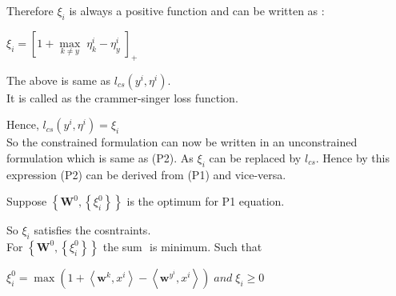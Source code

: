 \documentclass[a4paper,11pt]{article}
\begin{document}
\begin{mlsolution}
Therefore \begin{math} \xi_{i}\end{math} is always a positive function and can be written as :

\begin{math}\xi_{i} =   \left [  1 + \underset{k\neq y}{\max} \;\eta_{k}^{i} - \eta_{y} ^{i}\;\right ]_{+}\end{math}

The above is same as \begin{math} l_{cs}\left ( y^{i},\eta ^{i} \right ) \end{math}.\\ It is called as the crammer-singer loss function.

Hence, \begin{math} l_{cs}\left ( y^{i},\eta ^{i} \right ) = \xi _{i} \end{math}\\

So the constrained formulation can now be written in an unconstrained formulation which is same as (P2). As \begin{math} \xi _{i} \end{math} can be replaced by \begin{math} l_{cs}\end{math}. Hence by this expression (P2) can be derived from (P1) and vice-versa.

Suppose \begin{math} \left \{ \textbf{W}^{0}, \left \{ \xi _{i}^{0} \right \} \right \} \end{math} is the optimum for P1 equation.

So \begin{math}\xi_{i}\end{math} satisfies the cosntraints.\\

For \begin{math} \left \{ \textbf{W}^{0}, \left \{ \xi _{i}^{0} \right \} \right \} \end{math} the sum \begin{math}  \end{math} is minimum. Such that 

\begin{math}\xi_{i}^{0} =  \max \left ( 1 + \left \langle \textbf{w}^{k}, x^{i} \right \rangle - \left \langle \textbf{w}^{y^{i}}, x^{i} \right \rangle\right )  \;and\; \xi_{i}\geq 0
\end{math}\\


\end{mlsolution}
\end{document}
